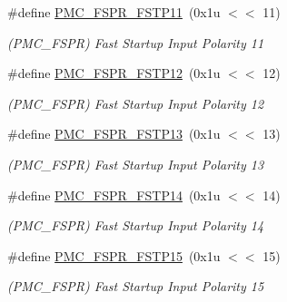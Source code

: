 \begin{DoxyCompactItemize}
\mbox{\label{group__SAME70__PMC_gaf2c300cdc4856c2dd7d1e1969886cb9b}} 
\#define \mbox{\hyperlink{group__SAME70__PMC_gaf2c300cdc4856c2dd7d1e1969886cb9b}{P\+M\+C\+\_\+\+F\+S\+P\+R\+\_\+\+F\+S\+T\+P11}}~(0x1u $<$$<$ 11)
\begin{DoxyCompactList}\small\item\em (P\+M\+C\+\_\+\+F\+S\+PR) Fast Startup Input Polarity 11 \end{DoxyCompactList}\item 
\mbox{\label{group__SAME70__PMC_ga687949a08c29554e21890356c019e2d8}} 
\#define \mbox{\hyperlink{group__SAME70__PMC_ga687949a08c29554e21890356c019e2d8}{P\+M\+C\+\_\+\+F\+S\+P\+R\+\_\+\+F\+S\+T\+P12}}~(0x1u $<$$<$ 12)
\begin{DoxyCompactList}\small\item\em (P\+M\+C\+\_\+\+F\+S\+PR) Fast Startup Input Polarity 12 \end{DoxyCompactList}\item 
\mbox{\label{group__SAME70__PMC_gab0cb8b39ace8a891b00b8bc8d961acdd}} 
\#define \mbox{\hyperlink{group__SAME70__PMC_gab0cb8b39ace8a891b00b8bc8d961acdd}{P\+M\+C\+\_\+\+F\+S\+P\+R\+\_\+\+F\+S\+T\+P13}}~(0x1u $<$$<$ 13)
\begin{DoxyCompactList}\small\item\em (P\+M\+C\+\_\+\+F\+S\+PR) Fast Startup Input Polarity 13 \end{DoxyCompactList}\item 
\mbox{\label{group__SAME70__PMC_ga4d6fe77d7d37e36ab3e289aaa9b9ab31}} 
\#define \mbox{\hyperlink{group__SAME70__PMC_ga4d6fe77d7d37e36ab3e289aaa9b9ab31}{P\+M\+C\+\_\+\+F\+S\+P\+R\+\_\+\+F\+S\+T\+P14}}~(0x1u $<$$<$ 14)
\begin{DoxyCompactList}\small\item\em (P\+M\+C\+\_\+\+F\+S\+PR) Fast Startup Input Polarity 14 \end{DoxyCompactList}\item 
\mbox{\label{group__SAME70__PMC_gaeb71bc909c4ed234066c0acbe8aa2452}} 
\#define \mbox{\hyperlink{group__SAME70__PMC_gaeb71bc909c4ed234066c0acbe8aa2452}{P\+M\+C\+\_\+\+F\+S\+P\+R\+\_\+\+F\+S\+T\+P15}}~(0x1u $<$$<$ 15)
\begin{DoxyCompactList}\small\item\em (P\+M\+C\+\_\+\+F\+S\+PR) Fast Startup Input Polarity 15 \end{DoxyCompactList}\item 
$$
\end{DoxyCompactItemize}
